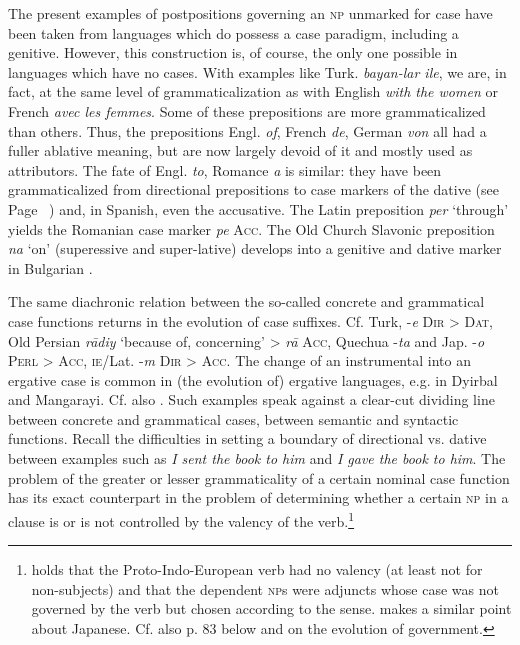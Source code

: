 \label{page88}The present examples of postpositions governing an \textsc{np} unmarked for case have been taken from languages which do possess a case paradigm, including a genitive. However, this construction is, of course, the only one possible in languages which have no cases. With examples like Turk. \textit{bayan-lar ile}, we are, in fact, at the same level of grammaticalization as with English \textit{with the women} or French \textit{avec les femmes}. Some of these prepositions are more grammaticalized than others. Thus, the prepositions Engl. \textit{of}, French \textit{de}, German \textit{von} all had a fuller ablative meaning, but are now largely devoid of it and mostly used as attributors. The fate of Engl. \textit{to}, Romance \textit{a} is similar: they have been grammaticalized from directional prepositions to case markers of the dative (see Page~\pageref{page100}\chk%
)  and, in Spanish, even the accusative. The Latin preposition \textit{per} ‘through’ yields the Romanian case marker \textit{pe} \textsc{Acc}. The Old Church Slavonic preposition \textit{na} ‘on’ (superessive and super-lative) develops into a genitive and dative marker in Bulgarian \citep{Qvonje1979}.

The same diachronic relation between the so-called concrete and grammatical case functions returns in the evolution of case suffixes. Cf. Turk, -\textit{e} \textsc{Dir} {\textgreater} \textsc{Dat}, Old Persian \textit{r\=adiy} ‘because of, concerning’ {\textgreater} \textit{r\=a} \textsc{Acc}, Quechua -\textit{ta} and Jap. -\textit{o} \textsc{Perl} {\textgreater} \textsc{Acc}, \textsc{ie}/Lat. -\textit{m} \textsc{Dir} {\textgreater} \textsc{Acc}. The change of an instrumental into an ergative case is common in (the evolution of) ergative languages, e.g. in Dyirbal and Mangarayi. Cf. also . Such examples speak against a clear-cut dividing line between concrete and grammatical cases, between semantic and syntactic functions. Recall the difficulties in setting a boundary of directional vs. dative between examples such as \textit{I sent the book to him} and \textit{I gave the book to him}. The problem of the greater or lesser grammaticality of a certain nominal case function has its exact counterpart in the problem of determining whether a certain \textsc{np} in a clause is or is not controlled by the valency of the verb.\footnote{\citet[357--359]{Meillet1934} holds that the Proto-Indo-European verb had no valency (at least not for non-subjects) and that the dependent \textsc{np}s were adjuncts whose case was not governed by the verb but chosen according to the sense. \citet{Coseriu1979} makes a similar point about Japanese. Cf. also p. 83 below and \citealt[§4.2]{Lehmann1983} on the evolution of government.}

